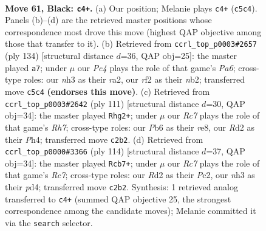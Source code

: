 \documentclass[11pt]{article}
\begin{document}
\clearpage

\begin{figure}[p]\centering
\begin{subfigure}{0.46\textwidth}\centering
\resizebox{\linewidth}{!}{%
\newchessgame
\chessboard[
  setfen={8/6k1/1pb5/p1p5/8/1K4PN/2rr1R1P/8 b - - 0 61},
  showmover=false,
  pgfstyle=straightmove, color=movearrow, markmove={c5-c4}
]}
\caption{}
\end{subfigure}\hfill
\begin{subfigure}{0.46\textwidth}\centering
\resizebox{\linewidth}{!}{%
\newchessgame
\chessboard[
  setfen={3R4/7p/P1k3p1/3R1p2/5P2/3p2P1/rn4K1/8 w - - 3 68},
  showmover=false,
  pgfstyle=straightmove, color=movearrow, markmove={a6-a7}
]}
\caption{}
\end{subfigure}
\\[4pt]
\begin{subfigure}{0.46\textwidth}\centering
\resizebox{\linewidth}{!}{%
\newchessgame
\chessboard[
  setfen={4R3/8/5k2/4N3/4P2p/5Pp1/5r1r/3R2K1 b - - 11 56},
  showmover=false,
  pgfstyle=straightmove, color=movearrow, markmove={h2-g2}
]}
\caption{}
\end{subfigure}\hfill
\begin{subfigure}{0.46\textwidth}\centering
\resizebox{\linewidth}{!}{%
\newchessgame
\chessboard[
  setfen={1k5r/R1R5/p7/8/3p1r2/p7/2P1KP2/8 w - - 6 58},
  showmover=false,
  pgfstyle=straightmove, color=movearrow, markmove={c7-b7}
]}
\caption{}
\end{subfigure}
\caption{\textbf{Move 61, Black: \texttt{c4+}.} (a) Our position; Melanie plays \texttt{c4+} (\texttt{c5c4}). Panels (b)--(d) are the retrieved master positions whose correspondence most drove this move (highest QAP objective among those that transfer to it). (b) Retrieved from \texttt{ccrl\_top\_p0003\#2657} (ply 134) [structural distance $d$=36, QAP obj=25]: the master played \texttt{a7}; under $\mu$ our \emph{Pc4} plays the role of that game's \emph{Pa6}; cross-type roles: our \emph{n}h3 as their \emph{r}a2, our \emph{r}f2 as their \emph{n}b2; transferred move \texttt{c5c4} \textbf{(endorses this move)}. (c) Retrieved from \texttt{ccrl\_top\_p0003\#2642} (ply 111) [structural distance $d$=30, QAP obj=34]: the master played \texttt{Rhg2+}; under $\mu$ our \emph{Rc7} plays the role of that game's \emph{Rh7}; cross-type roles: our \emph{P}b6 as their \emph{r}e8, our \emph{R}d2 as their \emph{P}h4; transferred move \texttt{c2b2}. (d) Retrieved from \texttt{ccrl\_top\_p0000\#3366} (ply 114) [structural distance $d$=37, QAP obj=34]: the master played \texttt{Rcb7+}; under $\mu$ our \emph{Rc7} plays the role of that game's \emph{Rc7}; cross-type roles: our \emph{R}d2 as their \emph{P}c2, our \emph{n}h3 as their \emph{p}d4; transferred move \texttt{c2b2}. Synthesis: 1 retrieved analog transferred to \texttt{c4+} (summed QAP objective 25, the strongest correspondence among the candidate moves); Melanie committed it via the \texttt{search} selector.}
\label{fig:thought-m121}
\end{figure}
\end{document}
